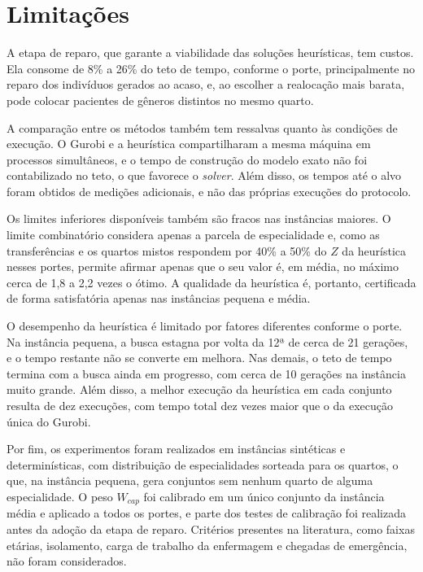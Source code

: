 \section{Limitações}

A etapa de reparo, que garante a viabilidade das soluções heurísticas, tem custos. Ela consome de 8\% a 26\% do teto de tempo, conforme o porte, principalmente no reparo dos indivíduos gerados ao acaso, e, ao escolher a realocação mais barata, pode colocar pacientes de gêneros distintos no mesmo quarto.

A comparação entre os métodos também tem ressalvas quanto às condições de execução. O Gurobi e a heurística compartilharam a mesma máquina em processos simultâneos, e o tempo de construção do modelo exato não foi contabilizado no teto, o que favorece o \textit{solver}. Além disso, os tempos até o alvo foram obtidos de medições adicionais, e não das próprias execuções do protocolo.

Os limites inferiores disponíveis também são fracos nas instâncias maiores. O limite combinatório considera apenas a parcela de especialidade e, como as transferências e os quartos mistos respondem por 40\% a 50\% do $Z$ da heurística nesses portes, permite afirmar apenas que o seu valor é, em média, no máximo cerca de 1,8 a 2,2 vezes o ótimo. A qualidade da heurística é, portanto, certificada de forma satisfatória apenas nas instâncias pequena e média.

O desempenho da heurística é limitado por fatores diferentes conforme o porte. Na instância pequena, a busca estagna por volta da 12ª de cerca de 21 gerações, e o tempo restante não se converte em melhora. Nas demais, o teto de tempo termina com a busca ainda em progresso, com cerca de 10 gerações na instância muito grande. Além disso, a melhor execução da heurística em cada conjunto resulta de dez execuções, com tempo total dez vezes maior que o da execução única do Gurobi.

Por fim, os experimentos foram realizados em instâncias sintéticas e determinísticas, com distribuição de especialidades sorteada para os quartos, o que, na instância pequena, gera conjuntos sem nenhum quarto de alguma especialidade. O peso $W_{cap}$ foi calibrado em um único conjunto da instância média e aplicado a todos os portes, e parte dos testes de calibração foi realizada antes da adoção da etapa de reparo. Critérios presentes na literatura, como faixas etárias, isolamento, carga de trabalho da enfermagem e chegadas de emergência, não foram considerados.

